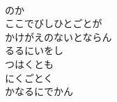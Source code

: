 \documentclass[10pt,b5j]{tarticle} %
\begin{document}
\begin{enumerate}
\begin{minipage}[c]{\blocksize}
    \end{minipage}
    \begin{minipage}[c]{\blocksize}
        
        \vspace{\linespace}
        \item~\\
        のか\\
        ここでびしひとごとが\\
        かけがえのないとならん\\
        るるにいをし\\
        つはくとも\\
        にくごとく\\
        かなるにでかん

    
    \end{minipage}
\end{enumerate} %
\end{document}
